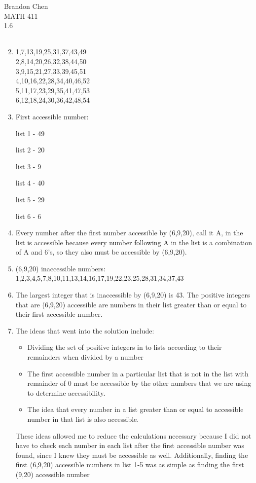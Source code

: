 \documentclass[11pt]{article}
\begin{document}
\noindent Brandon Chen \\
MATH 411
\\

1.6\\
\\
\begin{enumerate}
\setcounter{enumi}{1}
\item
1,7,13,19,25,31,37,43,49\\
2,8,14,20,26,32,38,44,50\\
3,9,15,21,27,33,39,45,51\\
4,10,16,22,28,34,40,46,52\\
5,11,17,23,29,35,41,47,53\\
6,12,18,24,30,36,42,48,54\\

\item
First accessible number:

list 1 - 49

list 2 - 20

list 3 - 9

list 4 - 40

list 5 - 29

list 6 - 6

\item
Every number after the first number accessible by (6,9,20), call it A, in the list is accessible because every number following A in the list is a combination of A and 6's, so they also must be accessible by (6,9,20).

\item
(6,9,20) inaccessible numbers:\\
1,2,3,4,5,7,8,10,11,13,14,16,17,19,22,23,25,28,31,34,37,43

\item
The largest integer that is inaccessible by (6,9,20) is 43.
The positive integers that are (6,9,20) accessible are numbers in their list greater than or equal to their first accessible number.


\item
The ideas that went into the solution include:

\begin{itemize}
\item Dividing the set of positive integers in to lists according to their remainders when divided by a number
\item The first accessible number in a particular list that is not in the list with remainder of 0 must be accessible by the other numbers that we are using to determine accessibility. 
\item The idea that every number in a list greater than or equal to accessible number in that list is also accessible.
\end{itemize}


These ideas allowed me to reduce the calculations necessary because I did not have to check each number in each list after the first accessible number was found, since I knew they must be accessible as well. Additionally, finding the first (6,9,20) accessible numbers in list 1-5 was as simple as finding the first (9,20) accessible number

\end{enumerate}
\end{document}
